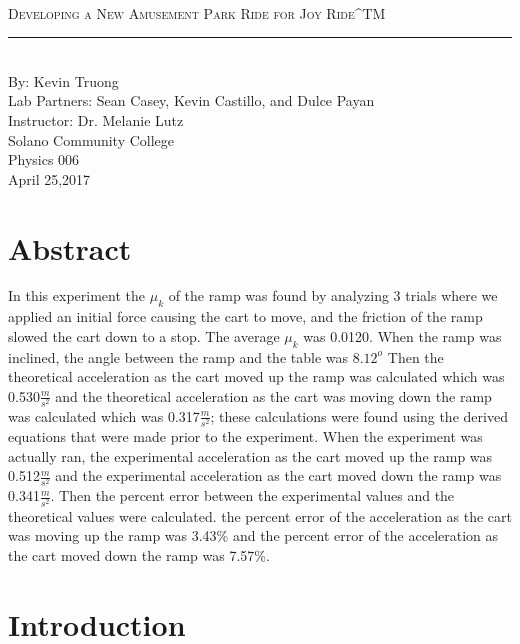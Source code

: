 \documentclass[aps,letterpaper,11pt]{revtex4}
\newcommand{\labno}{9}
\newcommand{\labtitle}{Developing a New Amusement Park Ride for Joy Ride^{TM}}
\newcommand{\authorname}{Kevin Truong}
\newcommand{\professor}{Dr. Melanie Lutz}
\newcommand{\classno}{Physics 006}
\newcommand{\labpartners}{Sean Casey, Kevin Castillo, and Dulce Payan}
\newcommand{\submitdate}{April 25,2017}
\begin{document}
\begin{titlepage}
\begin{center}
\hspace{-136mm}\boxed{{\Large \textsc{Lab No. \labno}}}\\\vspace{30mm}
{\Large \textsc{\labtitle} \\ \vspace{4pt}}
\rule[13pt]{\textwidth}{1pt}\\ \vspace{150pt}
{\large By: \authorname \\ \vspace{10pt}}
Lab Partners: \labpartners \\
Instructor: \professor \vspace{10pt} \\
Solano Community College\\ \classno \\ \vspace{10pt}
\submitdate
\end{center}
\end{titlepage}

\section{Abstract}

In this experiment the $\mu_k$ of the ramp was found by analyzing 3 trials where we applied an initial force causing the cart to move, and the friction of the ramp slowed the cart down to a stop. The average $\mu_k$ was 0.0120. When the ramp was inclined, the angle between the ramp and the table was $8.12^o$ Then the theoretical acceleration as the cart moved up the ramp was calculated which was 0.530$\frac{m}{s^2}$ and the theoretical acceleration as the cart was moving down the ramp was calculated which was 0.317$\frac{m}{s^2}$; these calculations were found using the derived equations that were made prior to the experiment. When the experiment was actually ran, the experimental acceleration as the cart moved up the ramp was 0.512$\frac{m}{s^2}$ and the experimental acceleration as the cart moved down the ramp was 0.341$\frac{m}{s^2}$. Then the percent error between the experimental values and the theoretical values were calculated. the percent error of the acceleration as the cart was moving up the ramp was 3.43\% and the percent error of the acceleration as the cart moved down the ramp was 7.57\%.


\section{Introduction}
\end{document}
